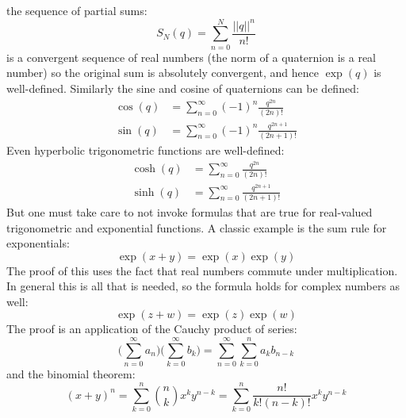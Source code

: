 \documentclass{article}
\theoremstyle{plain}
\theoremstyle{normal}
\begin{document}
            the sequence of partial sums:
            \begin{equation}
                S_{N}(q)=\sum_{n=0}^{N}\frac{||q||^{n}}{n!}
            \end{equation}
            is a convergent sequence of real numbers (the norm of a quaternion
            is a real number) so the original sum is absolutely convergent,
            and hence $\exp(q)$ is well-defined. Similarly the sine and cosine
            of quaternions can be defined:
            \begin{align}
                \cos(q)&=\sum_{n=0}^{\infty}(-1)^{n}\frac{q^{2n}}{(2n)!}\\
                \sin(q)&=\sum_{n=0}^{\infty}(-1)^{n}\frac{q^{2n+1}}{(2n+1)!}
            \end{align}
            Even hyperbolic trigonometric functions are well-defined:
            \begin{align}
                \cosh(q)&=\sum_{n=0}^{\infty}\frac{q^{2n}}{(2n)!}\\
                \sinh(q)&=\sum_{n=0}^{\infty}\frac{q^{2n+1}}{(2n+1)!}
            \end{align}
            But one must take care to not invoke formulas that are true for
            real-valued trigonometric and exponential functions. A classic
            example is the sum rule for exponentials:
            \begin{equation}
                \exp(x+y)=\exp(x)\exp(y)
            \end{equation}
            The proof of this uses the fact that real numbers commute under
            multiplication. In general this is all that is needed, so the
            formula holds for complex numbers as well:
            \begin{equation}
                \exp(z+w)=\exp(z)\exp(w)
            \end{equation}
            The proof is an application of the Cauchy product of series:
            \begin{equation}
                \Big(\sum_{n=0}^{\infty}a_{n}\Big)
                    \Big(\sum_{k=0}^{\infty}b_{k}\Big)
                =\sum_{n=0}^{\infty}\sum_{k=0}^{n}a_{k}b_{n-k}
            \end{equation}
            and the binomial theorem:
            \begin{equation}
                (x+y)^{n}
                =\sum_{k=0}^{n}\binom{n}{k}x^{k}y^{n-k}
                =\sum_{k=0}^{n}\frac{n!}{k!(n-k)!}x^{k}y^{n-k}
            \end{equation}
\end{document}
